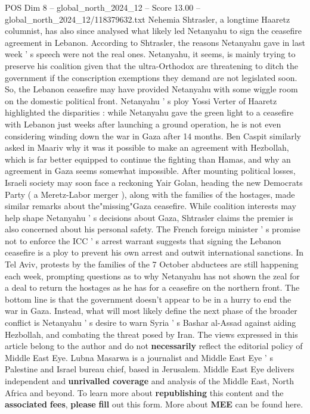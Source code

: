 \begin{textsample}{POS Dim 8 – global\_north\_2024\_12 – Score 13.00 – global\_north\_2024\_12/118379632.txt}
Nehemia Shtrasler, a longtime Haaretz columnist, has also since analysed what likely led Netanyahu to sign the ceasefire agreement in Lebanon.
According to Shtrasler, the reasons Netanyahu gave in last week ' s speech were not the real ones.
Netanyahu, it seems, is mainly trying to preserve his coalition given that the ultra-Orthodox are threatening to ditch the government if the conscription exemptions they demand are not legislated soon.
So, the Lebanon ceasefire may have provided Netanyahu with some wiggle room on the domestic political front.
Netanyahu ' s ploy Yossi Verter of Haaretz highlighted the disparities : while Netanyahu gave the green light to a ceasefire with Lebanon just weeks after launching a ground operation, he is not even considering winding down the war in Gaza after 14 months.
Ben Caspit similarly asked in Maariv why it was it possible to make an agreement with Hezbollah, which is far better equipped to continue the fighting than Hamas, and why an agreement in Gaza seems somewhat impossible.
After mounting political losses, Israeli society may soon face a reckoning Yair Golan, heading the new Democrats Party ( a Meretz-Labor merger ), along with the families of the hostages, made similar remarks about the"missing"Gaza ceasefire.
While coalition interests may help shape Netanyahu ' s decisions about Gaza, Shtrasler claims the premier is also concerned about his personal safety.
The French foreign minister ' s promise not to enforce the ICC ' s arrest warrant suggests that signing the Lebanon ceasefire is a ploy to prevent his own arrest and outwit international sanctions.
In Tel Aviv, protests by the families of the 7 October abductees are still happening each week, prompting questions as to why Netanyahu has not shown the zeal for a deal to return the hostages as he has for a ceasefire on the northern front.
The bottom line is that the government doesn't appear to be in a hurry to end the war in Gaza.
Instead, what will most likely define the next phase of the broader conflict is Netanyahu ' s desire to warn Syria ' s Bashar al-Assad against aiding Hezbollah, and combating the threat posed by Iran.
The views expressed in this article belong to the author and do not \textbf{necessarily} reflect the editorial policy of Middle East Eye.
Lubna Masarwa is a journalist and Middle East Eye ' s Palestine and Israel bureau chief, based in Jerusalem.
Middle East Eye delivers independent and \textbf{unrivalled} \textbf{coverage} and analysis of the Middle East, North Africa and beyond.
To learn more about \textbf{republishing} this content and the \textbf{associated} \textbf{fees}, \textbf{please} \textbf{fill} out this form.
More about \textbf{MEE} can be found here.

\end{textsample}
